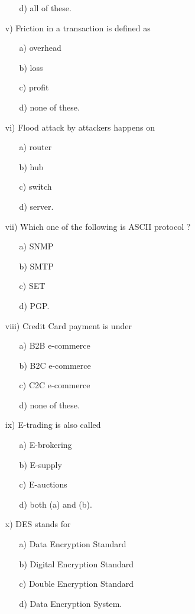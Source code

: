 \documentclass{article}
\begin{document}
\begin{enumerate}
\begin{enumerate}
        \item[d)] all of these.
    \end{enumerate}
    \item[v)] Friction in a transaction is defined as
    \begin{enumerate}
        \item[a)] overhead
        \item[b)] loss
        \item[c)] profit
        \item[d)] none of these.
    \end{enumerate}
    \item[vi)] Flood attack by attackers happens on
    \begin{enumerate}
        \item[a)] router
        \item[b)] hub
        \item[c)] switch
        \item[d)] server.
    \end{enumerate}
    \item[vii)] Which one of the following is ASCII protocol ?
    \begin{enumerate}
        \item[a)] SNMP
        \item[b)] SMTP
        \item[c)] SET
        \item[d)] PGP.
    \end{enumerate}
    \item[viii)] Credit Card payment is under
    \begin{enumerate}
        \item[a)] B2B e-commerce
        \item[b)] B2C e-commerce
        \item[c)] C2C e-commerce
        \item[d)] none of these.
    \end{enumerate}
    \item[ix)] E-trading is also called
    \begin{enumerate}
        \item[a)] E-brokering
        \item[b)] E-supply
        \item[c)] E-auctions
        \item[d)] both (a) and (b).
    \end{enumerate}
    \item[x)] DES stands for
    \begin{enumerate}
        \item[a)] Data Encryption Standard
        \item[b)] Digital Encryption Standard
        \item[c)] Double Encryption Standard
        \item[d)] Data Encryption System.
    \end{enumerate}
\end{enumerate}
\end{document}
